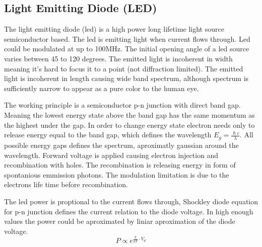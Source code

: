 \documentclass[\main/master.tex]{subfiles}
\begin{document}
\subsection{Light Emitting Diode (LED)}
The light emitting diode (led) is a high power long lifetime light source semiconductor based. The led is emitting light when current flows through. Led could be modulated at up to 100MHz. The initial opening angle of a led source varies between 45 to 120 degrees. The emitted light is incoherent in width meaning it's hard to focus it to a point (not diffraction limited). The emitted light is incoherent in length causing wide band spectrum, although spectrum is sufficiently narrow to appear as a pure color to the human eye.
\par
The working principle is a semiconductor p-n junction with direct band gap. Meaning the lowest energy state above the band gap has the same momentum as the highest under the gap. In order to change energy state electron needs only to release energy equal to the band gap, which defines the wavelength $E_g = \frac{\hslash c}{\lambda}$. All possible energy gaps defines the spectrum, aproximatly gaussian around the wavelength. Forward voltage is applied causing electron injection and recombination with holes. The recombination is releasing energy in form of spontanious emmission photons. The modulation limitation is due to the electrons life time before recombination.
\par
The led power is proptional to the current flows through, Shockley diode equation for p-n junction defines the current relation to the diode voltage. In high enough values the power could be aproximated by liniar aproximation of the diode voltage.
\begin{equation}
P\propto e^{\frac{q}{kT}\cdot V_d}\label{eqn:energy-mass-equivalence-relation}
\end{equation}
\end{document}

